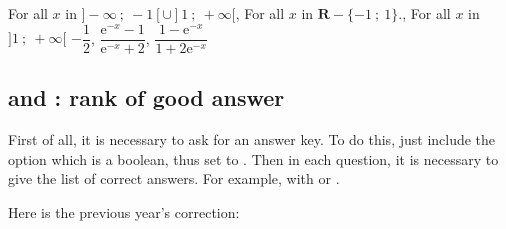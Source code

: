 \medskip
\begin{tkzexample}
 \begin{alterqcm}[lq=85mm,pq=2mm]
  {{For all $x$ in  $]- \infty~;~-1[ \cup]1~;~+ \infty[$},
  {For all $x$ in $\mathbf{R} - \{-1~ ;~ 1\}$.},
  {For all $x$ in $]1~ ;~+\infty[$}}
  {{$-\dfrac{1}{2}$},
  {$\dfrac{\text{e}^{-x} - 1}{\text{e}^{-x} + 2}$},
  {$\dfrac{1 - \text{e}^{-x}}{1 + 2\text{e}^{-x}}$}}
  \end{alterqcm}
 \end{tkzexample}


\subsection{ and  : rank of good answer}
  
First of all, it is necessary to ask for an answer key. To do this, just include the option  which is a boolean, thus set to . Then in each question, it is necessary to give the list of correct answers. For example, with  or .

Here is the previous year's correction:

\medskip
\begin{tkzexample}
\begin{alterqcm}[VF,correction,lq=125mm]
 \AQquestion[br=1]{For all $x \in ]-3~;~2],~f'(x) \geqslant 0$.}
\end{alterqcm}
\end{tkzexample}


\endinput
